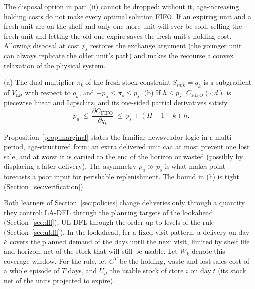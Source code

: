 The disposal option in part (ii) cannot be dropped: without it, age-increasing holding costs do not make every optimal solution FIFO. If an expiring unit and a fresh unit are on the shelf and only one more unit will ever be sold, selling the fresh unit and letting the old one expire saves the fresh unit's holding cost. Allowing disposal at cost $p_s$ restores the exchange argument (the younger unit can always replicate the older unit's path) and makes the recourse a convex relaxation of the physical system.

\begin{proposition}\label{prop:marginal}
(a) The dual multiplier $\pi_k$ of the fresh-stock constraint $S_{imk}=q_k$ is a subgradient of $V_{\mathrm{LP}}$ with respect to $q_k$, and $-p_u\le \pi_k\le p_s$. (b) If $h\le p_s$, $C_{\mathrm{FIFO}}(\cdot;d)$ is piecewise linear and Lipschitz, and its one-sided partial derivatives satisfy
\begin{equation}\label{eq:marg}
  -p_u\ \le\ \frac{\partial C_{\mathrm{FIFO}}}{\partial q_k}\ \le\ p_s + (H-1-k)\,h .
\end{equation}
\end{proposition}

Proposition~\ref{prop:marginal} states the familiar newsvendor logic in a multi-period, age-structured form: an extra delivered unit can at most prevent one lost sale, and at worst it is carried to the end of the horizon or wasted (possibly by displacing a later delivery). The asymmetry $p_u\gg p_s$ is what makes point forecasts a poor input for perishable replenishment. The bound in (b) is tight (Section~\ref{sec:verification}).

Both learners of Section~\ref{sec:policies} change deliveries only through a quantity they control: LA-DFL through the planning targets of the lookahead (Section~\ref{sec:dfl}), UL-DFL through the order-up-to levels of the rule (Section~\ref{sec:uldfl}). In the lookahead, for a fixed visit pattern, a delivery on day $k$ covers the planned demand of the days until the next visit, limited by shelf life and horizon, net of the stock that will still be usable. Let $W_k$ denote this coverage window. For the rule, let $C^{T}$ be the holding, waste and lost-sales cost of a whole episode of $T$ days, and $U_{it}$ the usable stock of store $i$ on day $t$ (its stock net of the units projected to expire).

